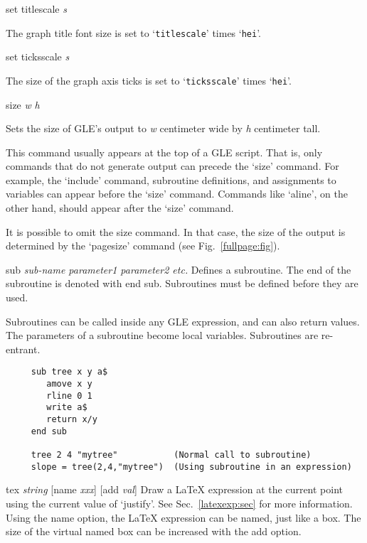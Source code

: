 \begin{commanddescription}
\item[{\sf set titlescale {\it s}}]

The graph title font size is set to `\texttt{titlescale}' times `\texttt{hei}'.

\item[{\sf set ticksscale {\it s}}]

The size of the graph axis ticks is set to `\texttt{ticksscale}' times `\texttt{hei}'.

\item[{\sf size {\it w} {\it h}}]

Sets the size of GLE's output to {\it w} centimeter wide by {\it h} centimeter tall.

This command usually appears at the top of a GLE script. That is, only commands that do not generate output can precede the `size' command. For example, the `include' command, subroutine definitions, and assignments to variables can appear before the `size' command. Commands like `aline', on the other hand, should appear after the `size' command.

It is possible to omit the size command. In that case, the size of the output is determined by the `pagesize' command (see Fig.~\ref{fullpage:fig}).

\item[{\sf sub {\it sub-name parameter1 parameter2 etc.}}]
 Defines a subroutine. The end of the subroutine
is denoted with {\sf end sub}.  Subroutines must
be defined before they are used.

Subroutines can be called inside any GLE expression, and can
also return values.  The parameters of a subroutine become local variables.
Subroutines are re-entrant.

\begin{Verbatim}
     sub tree x y a$
        amove x y
        rline 0 1
        write a$
        return x/y
     end sub

     tree 2 4 "mytree"           (Normal call to subroutine)
     slope = tree(2,4,"mytree")  (Using subroutine in an expression)
\end{Verbatim}

\item[{\sf tex {\it string} [name {\it xxx}] [add {\it val}]}]
Draw a \LaTeX{} expression at the current point using the current value of `justify'. See Sec.~\ref{latexexp:sec} for more information. Using the {\sf name} option, the \LaTeX{} expression can be named, just like a box. The size of the virtual named box can be increased with the {\sf add} option.


\end{commanddescription}

